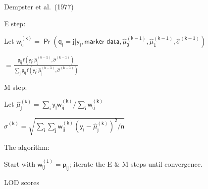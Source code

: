 \documentclass[12pt]{article}
\newcommand{\headsize}{\fontsize{35}{35} \selectfont}
\newcommand{\smallsize}{\fontsize{25}{30} \selectfont}
\begin{document}
\hfill
\begin{minipage}{10in}
\color{mywhite} \smallsize
 Dempster et al.\ (1977)
\vspace{5mm}

 {\color{mypink} E step}:
\vspace{5mm}

\hspace{10mm} Let \hspace{5mm} $\mathsf{w_{ij}^{(k)} = \Pr(q_i = j | y_i,\text{marker
data},\hat{\mu}_0^{(k-1)}, \hat{\mu}_1^{(k-1)},\hat{\sigma}^{(k-1)})}$
\vspace{5mm}

\hspace{56mm} $\mathsf{ = \frac{p_{ij} \,
f(y_i; \hat{\mu}_j^{(k-1)},\hat{\sigma}^{(k-1)})}{
\sum_j p_{ij} \, f(y_i; \hat{\mu}_j^{(k-1)},\hat{\sigma}^{(k-1)})}}$
\vspace{5mm}

 {\color{mypink} M step}:
\vspace{5mm}

\hspace{10mm} Let \hspace{5mm} $\mathsf{\hat{\mu}_j^{(k)} = \sum_i y_i w_{ij}^{(k)} / \sum_i
w_{ij}^{(k)}}$
\vspace{5mm}

\hspace{31.5mm} $\mathsf{\hat{\sigma}^{(k)} = \sqrt{ \sum_i \sum_j w_{ij}^{(k)}
(y_i-\hat{\mu}_j^{(k)})^2/n}}$
\vspace{5mm}

 {\color{mypink} The algorithm}:
\vspace{5mm}

\hspace{10mm} Start with $\mathsf{w_{ij}^{(1)} = p_{ij}}$; iterate the E \& M steps until
convergence.
\end{minipage}

\newpage

\addtocounter{page}{+1}

\headsize \color{myyellow}
\hfill \begin{minipage}{5.75in}
\centering
LOD scores
\end{minipage}

\vspace{25mm}
\end{document}
